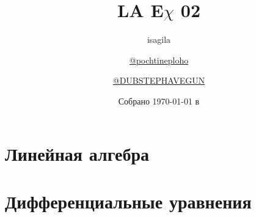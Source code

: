 \documentclass[a4paper]{article}
\title{\huge \textbf{LA E\(\chi\) 02}}
\author{
  isagila
  \and
  \href{https://t.me/pochtineploho}{@pochtineploho}
  \and
  \href{https://t.me/DUBSTEPHAVEGUN}{@DUBSTEPHAVEGUN}
}
\date{Собрано {\ddmmyyyydate\today} в \currenttime}
\begin{document}
\setlength{\abovedisplayskip}{-5pt}
\setlength{\abovedisplayshortskip}{0pt}
\setlength{\belowdisplayskip}{0pt}
\setlength{\belowdisplayshortskip}{0pt}

\clearpage
\maketitle
\thispagestyle{empty}
\newpage
\setcounter{page}{2}
\tableofcontents

\newpage
\section{Линейная алгебра}

\begin{questions}
  
  
  
  
  
  
  
  
  
  
  
  
  
  
\end{questions}

\newpage
\section{Дифференциальные уравнения}

\begin{questions}
  
  
  
  
  
  
  
  
  
  
  
  
  
  
  
  
  
  
  
  
\end{questions}
\end{document}
